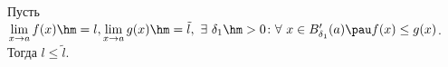 \label{pernes}
Пусть $\lim\limits_{x\to a}f(x)\hm=l,
\lim\limits_{x\to a}g(x)\hm=\tilde l,\ \exists\  \delta_1\hm>0\colon
\forall\  x\in B'_{\delta_1}(a)\pau f(x)\leq g(x)$. Тогда $l\leq \tilde l$.

